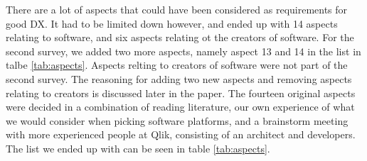 \documentclass{cslthse-msc}
\begin{document}
    There are a lot of aspects that could have been considered as requirements for
    good DX. It had to be limited down however, and ended up with 14 aspects relating to software, and six aspects relating ot the
    creators of software.
    For the second survey, we added two more aspects, namely aspect 13 and 14 in the list in talbe \ref{tab:aspects}. Aspects relting to
    creators of software were not part of the second survey.
    The reasoning for adding two new aspects and removing aspects relating to creators is
    discussed later in the paper. The fourteen original aspects were decided in a combination
    of reading literature, our own experience of what we would consider when
    picking software platforms, and a brainstorm meeting with more experienced
    people at Qlik, consisting of an architect and developers.
    The list we ended up with can be seen in table \ref{tab:aspects}.
\end{document}
